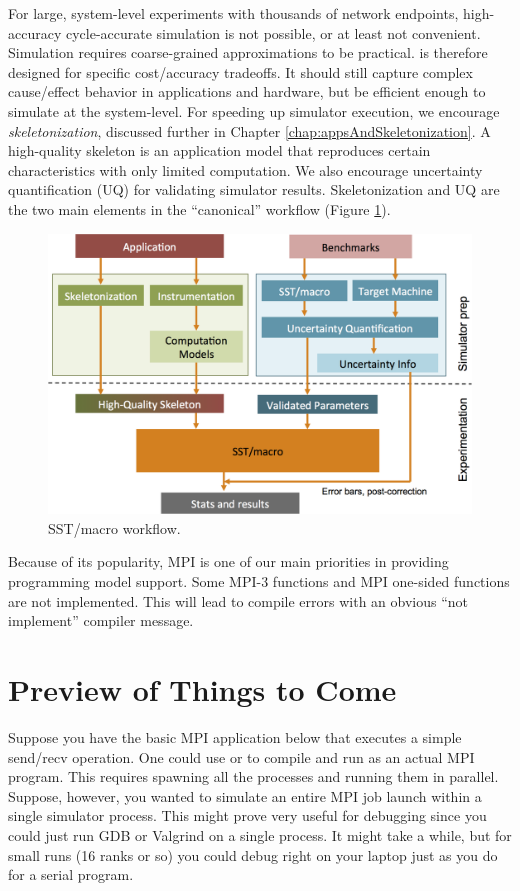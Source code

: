 For large, system-level experiments with thousands of network endpoints, high-accuracy cycle-accurate simulation is not possible,
or at least not convenient.
Simulation requires coarse-grained approximations to be practical.
\sstmacro is therefore designed for specific cost/accuracy tradeoffs.
It should still capture complex cause/effect behavior in applications and hardware, but be efficient enough to simulate at the system-level. 
For speeding up simulator execution, we encourage \textit{skeletonization}, discussed further in Chapter \ref{chap:appsAndSkeletonization}. 
A high-quality skeleton is an application model that reproduces certain characteristics with only limited computation.  
We also encourage uncertainty quantification (UQ) for validating simulator results.
Skeletonization and UQ are the two main elements in the ``canonical'' \sstmacro workflow (Figure \ref{fig:workflow}).

\begin{figure}[t]
  \centering
    \includegraphics[width=0.99\columnwidth]{figures/workflow.png}
      \caption{SST/macro workflow.}
      \label{fig:workflow}
\end{figure}

Because of its popularity, MPI is one of our main priorities in providing programming model support.  
Some MPI-3 functions and MPI one-sided functions are not implemented.
This will lead to compile errors with an obvious ``not implement'' compiler message.

\section{Preview of Things to Come}
Suppose you have the basic MPI application below that executes a simple send/recv operation.
One could use  or  to compile and run as an actual MPI program.
This requires spawning all the processes and running them in parallel.
Suppose, however, you wanted to simulate an entire MPI job launch within a single simulator process.
This might prove very useful for debugging since you could just run GDB or Valgrind on a single process.
It might take a while, but for small runs (16 ranks or so) you could debug right on your laptop just as you do for a serial program.

